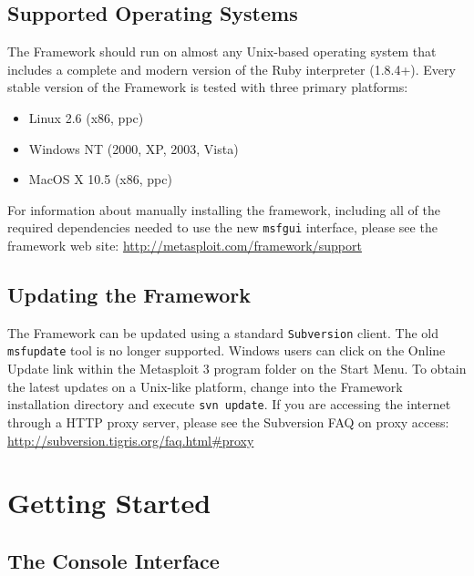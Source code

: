 \documentclass{report}
\begin{document}
    \section{Supported Operating Systems}
    \label{INSTALL-SUPPORT}

\par
The Framework should run on almost any Unix-based operating system that includes a complete and modern version 
of the Ruby interpreter (1.8.4+). Every stable version of the Framework is tested with three primary platforms: 

\begin{itemize}
\item Linux 2.6 (x86, ppc)
\item Windows NT (2000, XP, 2003, Vista)
\item MacOS X 10.5 (x86, ppc)
\end{itemize}

\par
For information about manually installing the framework, including all of the required dependencies needed
to use the new \texttt{msfgui} interface, please see the framework web site: \url{http://metasploit.com/framework/support}

    \section{Updating the Framework}
    \label{INSTALL-UPDATE}

\par
The Framework can be updated using a standard \texttt{Subversion} client. The
old \texttt{msfupdate} tool is no longer supported. Windows users can click on
the Online Update link within the Metasploit 3 program folder on the Start Menu.
To obtain the latest updates on a Unix-like platform, change into the Framework 
installation directory and execute \texttt{svn update}. If you are accessing the
internet through a HTTP proxy server, please see the Subversion FAQ on proxy 
access: \url{http://subversion.tigris.org/faq.html#proxy}

\pagebreak

\chapter{Getting Started}

    \section{The Console Interface}
    \label{STARTED-CONSOLE}
\end{document}
